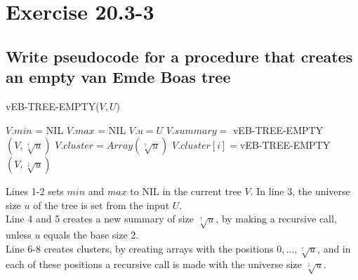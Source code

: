 \section*{Exercise 20.3-3}
\subsection*{Write pseudocode for a procedure that creates an empty van Emde Boas tree}

\begin{algorithm}
\caption*{vEB-TREE-EMPTY($V,U$)}\label{euclid}
\begin{algorithmic}[1]
\State $V.min$ = NIL
\State $V.max$ = NIL
\State $V.u = U$
\State $V.summary =$ vEB-TREE-EMPTY$(V, \sqrt[\uparrow]{u})$
\EndIf
\State $V.cluster = Array(\sqrt[\uparrow]{u})$
\State $V.cluster[i] = $vEB-TREE-EMPTY$(V, \sqrt[\downarrow]{u})$
\EndFor
\end{algorithmic}
\end{algorithm}

Lines 1-2 sets $min$ and $max$ to NIL in the current tree $V$. In line 3, the universe size $u$ of the tree is set from the input $U$.
\\
Line 4 and 5 creates a new summary of size $\sqrt[\uparrow]{u}$, by making a recursive call, unless $u$ equals the base size 2.
\\
Line 6-8 creates clusters, by creating arrays with the positions $0,...,\sqrt[\uparrow]{u}$, and in each of these positions a recursive call is made with the universe size $\sqrt[\downarrow]{u}$.